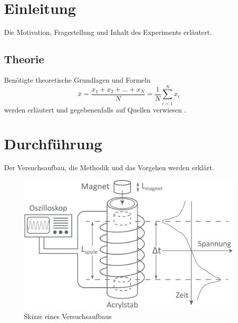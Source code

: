 \documentclass[10pt,a4paper]{article}
\begin{document}
\newpage
\thispagestyle{plain}
\tableofcontents
\newpage

\section{Einleitung}

Die Motivation, Fragestellung und Inhalt des Experiments erläutert.

\subsection{Theorie}

Benötigte theoretische Grundlagen und Formeln
\begin{equation}
\bar{x} = \frac{x_1 + x_2 + ... + x_N}{N} = \frac{1}{N} \sum_{i=1}^N x_{i}
\label{Mittelwert}
\end{equation}
werden erläutert und gegebenenfalls auf Quellen verwiesen \cite{balzert}. 


\section{Durchführung} %

Der Versuchsaufbau, die Methodik und das Vorgehen werden erklärt. 

\begin{figure}[H]
\centering
    \includegraphics[scale=0.25]{bilder/Aufbau.png}
  \caption{Skizze eines Versuchsaufbaus \cite{ind}}
  \label{Versuchsaufbau}
\end{figure}
\end{document}
